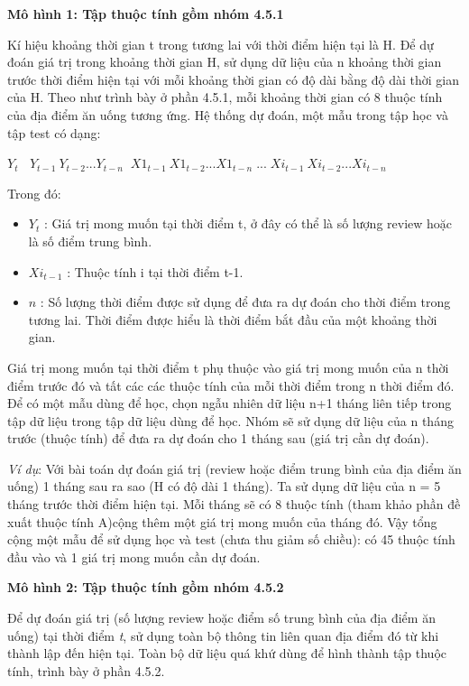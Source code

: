 \documentclass[12pt]{extarticle}
\begin{document}
			\par \textbf{Mô hình 1: Tập thuộc tính gồm nhóm 4.5.1}
			\par Kí hiệu khoảng thời gian t trong tương lai với thời điểm hiện tại là H. Để dự đoán giá trị trong khoảng thời gian H, sử dụng dữ liệu của n khoảng thời gian trước thời điểm hiện tại với mỗi khoảng thời gian có độ dài bằng độ dài thời gian của H. Theo như trình bày ở phần 4.5.1, mỗi khoảng thời gian có 8 thuộc tính của địa điểm ăn uống tương ứng. Hệ thống dự đoán, một mẫu trong tập học và tập test có dạng:
			\begin{center}
				 \textbf{$Y_{t}$} $\; \;Y_{t-1}\:Y_{t-2}...Y_{t-n}\;\;X1_{t-1}\:X1_{t-2}...X1_{t-n}\;...\;Xi_{t-1}\:Xi_{t-2}...Xi_{t-n}$
			\end{center}
			\par Trong đó:
				\begin{itemize}
					\item $  Y_{t}$ : Giá trị mong muốn tại thời điểm t, ở đây có thể là số lượng review hoặc là số điểm trung bình.
					\item $Xi_{t-1}$ : Thuộc tính i tại thời điểm t-1.
					\item $n$ : Số lượng thời điểm được sử dụng để đưa ra dự đoán cho thời điểm trong tương lai. Thời điểm được hiểu là thời điểm bắt đầu của một khoảng thời gian.
				\end{itemize}
			\par Giá trị mong muốn tại thời điểm t phụ thuộc vào giá trị mong muốn của n thời điểm trước đó và tất các các thuộc tính của mỗi thời điểm trong n thời điểm đó. Để có một mẫu dùng để học, chọn ngẫu nhiên dữ liệu n+1 tháng liên tiếp trong tập dữ liệu trong tập dữ liệu dùng để học. Nhóm sẽ sử dụng dữ liệu của n tháng trước (thuộc tính) để đưa ra dự đoán cho 1 tháng sau (giá trị cần dự đoán).
			\par \textit{Ví dụ}: Với bài toán dự đoán giá trị (review hoặc điểm trung bình của địa điểm ăn uống) 1 tháng sau ra sao (H có độ dài 1 tháng). Ta sử dụng dữ liệu của n = 5 tháng trước thời điểm hiện tại. Mỗi tháng sẽ có 8 thuộc tính (tham khảo phần đề xuất thuộc tính A)cộng thêm một giá trị mong muốn của tháng đó. Vậy tổng cộng một mẫu để sử dụng học và test (chưa thu giảm số chiều): có 45 thuộc tính đầu vào và 1 giá trị mong muốn cần dự đoán.
			\par \textbf{Mô hình 2: Tập thuộc tính gồm nhóm 4.5.2}
			\par Để dự đoán giá trị (số lượng review hoặc điểm số trung bình của địa điểm ăn uống) tại thời điểm \textit{t}, sử dụng toàn bộ thông tin liên quan địa điểm đó từ khi thành lập đến hiện tại. Toàn bộ dữ liệu quá khứ dùng để hình thành tập thuộc tính, trình bày ở phần 4.5.2.
\end{document}
